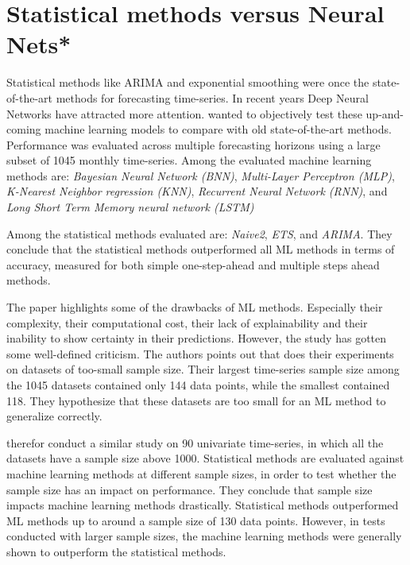 \section{Statistical methods versus Neural Nets*}
\label{section:RelatedWork:Statistical-NN}

Statistical methods like ARIMA and exponential smoothing were once the state-of-the-art methods for forecasting time-series.
In recent years Deep Neural Networks have attracted more attention.
\cite{Makridakis2018} wanted to objectively test these up-and-coming machine learning models to compare with old state-of-the-art methods.
Performance was evaluated across multiple forecasting horizons using a large subset of 1045 monthly time-series.
Among the evaluated machine learning methods are:
\textit{Bayesian Neural Network (BNN)},
\textit{Multi-Layer Perceptron (MLP)},
\textit{K-Nearest Neighbor regression (KNN)},
\textit{Recurrent Neural Network (RNN)}, and
\textit{Long Short Term Memory neural network (LSTM)}


Among the statistical methods evaluated are:
\textit{Naive2},
\textit{ETS}, and
\textit{ARIMA}.
They conclude that the statistical methods outperformed all ML methods in terms of accuracy, measured for both
simple one-step-ahead and multiple steps ahead methods.

The paper \cite{Makridakis2018} highlights some of the drawbacks of ML methods. Especially their complexity, their computational cost,
their lack of explainability and their inability to show certainty in their predictions.
However, the study has gotten some well-defined criticism. The authors \citeauthor*{Cerqueira2019} points
out that \cite{Makridakis2018} does their experiments on datasets of too-small sample size.
Their largest time-series sample size among the 1045 datasets contained only 144 data points, while the smallest contained 118.
They hypothesize that these datasets are too small for an ML method to generalize correctly.

\cite{Cerqueira2019} therefor conduct a similar study on 90 univariate time-series, in which
all the datasets have a sample size above 1000.
Statistical methods are evaluated against machine learning methods at different sample sizes,
in order to test whether the sample size has an impact on performance.
They conclude that sample size impacts machine learning methods drastically.
Statistical methods outperformed ML methods up to around a sample size of 130 data points.
However, in tests conducted with larger sample sizes, the machine learning methods were generally shown to outperform the statistical methods.

